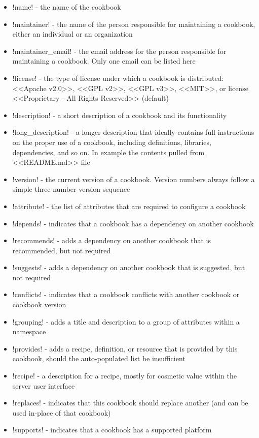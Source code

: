 \begin{itemize}
  \item \inline!name! - the name of the cookbook
  \item \inline!maintainer! - the name of the person responsible for maintaining a cookbook, either an individual or an organization
  \item \inline!maintainer_email! - the email address for the person responsible for maintaining a cookbook. Only one email can be listed here
  \item \inline!license! - the type of license under which a cookbook is distributed: <<Apache v2.0>>, <<GPL v2>>, <<GPL v3>>, <<MIT>>, or license <<Proprietary - All Rights Reserved>> (default)
  \item \inline!description! - a short description of a cookbook and its functionality
  \item \inline!long_description! - a longer description that ideally contains full instructions on the proper use of a cookbook, including definitions, libraries, dependencies, and so on. In example the contents pulled from <<README.md>> file
  \item \inline!version! - the current version of a cookbook. Version numbers always follow a simple three-number version sequence
  \item \inline!attribute! - the list of attributes that are required to configure a cookbook
  \item \inline!depends! - indicates that a cookbook has a dependency on another cookbook
  \item \inline!recommends! - adds a dependency on another cookbook that is recommended, but not required
  \item \inline!suggests! - adds a dependency on another cookbook that is suggested, but not required
  \item \inline!conflicts! - indicates that a cookbook conflicts with another cookbook or cookbook version
  \item \inline!grouping! - adds a title and description to a group of attributes within a namespace
  \item \inline!provides! - adds a recipe, definition, or resource that is provided by this cookbook, should the auto-populated list be insufficient
  \item \inline!recipe! - a description for a recipe, mostly for cosmetic value within the server user interface
  \item \inline!replaces! - indicates that this cookbook should replace another (and can be used in-place of that cookbook)
  \item \inline!supports! - indicates that a cookbook has a supported platform
\end{itemize}

